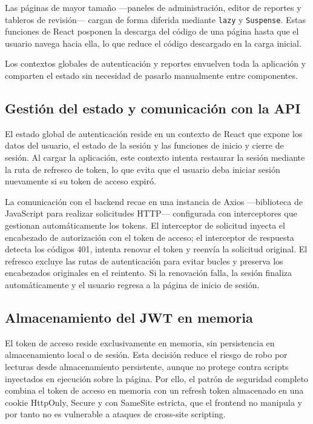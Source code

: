 Las páginas de mayor tamaño —paneles de administración, editor de reportes y tableros de revisión— cargan de forma diferida mediante \texttt{lazy} y \texttt{Suspense}. 
Estas funciones de React posponen la descarga del código de una página hasta que el usuario navega hacia ella, lo que reduce el código descargado en la carga inicial.

Los contextos globales de autenticación y reportes envuelven toda la aplicación y comparten el estado sin necesidad de pasarlo manualmente entre componentes.

\subsection{Gestión del estado y comunicación con la API}

El estado global de autenticación reside en un contexto de React que expone los datos del usuario, el estado de la sesión y las funciones de inicio y cierre de sesión. Al cargar la aplicación, este contexto intenta restaurar la sesión mediante la ruta de refresco de token, lo que evita que el usuario deba iniciar sesión nuevamente si su token de acceso expiró.

La comunicación con el backend recae en una instancia de Axios —biblioteca de JavaScript para realizar solicitudes HTTP— configurada con interceptores que gestionan automáticamente los tokens. 
El interceptor de solicitud inyecta el encabezado de autorización con el token de acceso; el interceptor de respuesta detecta los códigos 401, intenta renovar el token y reenvía la solicitud original. El refresco excluye las rutas de autenticación para evitar bucles y preserva los encabezados originales en el reintento. 
Si la renovación falla, la sesión finaliza automáticamente y el usuario regresa a la página de inicio de sesión.

\subsection{Almacenamiento del JWT en memoria}

El token de acceso reside exclusivamente en memoria, sin persistencia en almacenamiento local o de sesión. 
Esta decisión reduce el riesgo de robo por lecturas desde almacenamiento persistente, aunque no protege contra scripts inyectados en ejecución sobre la página.
Por ello, el patrón de seguridad completo combina el token de acceso en memoria con un refresh token almacenado en una cookie HttpOnly, Secure y con SameSite estricta, que el frontend no manipula y por tanto no es vulnerable a ataques de cross-site scripting.

